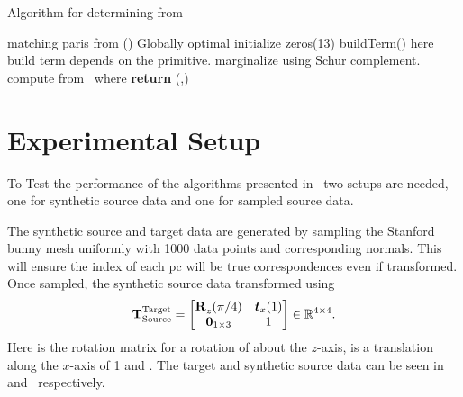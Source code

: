 \begin{algorithm}
	\algrenewcommand{}
	\algrenewcommand{}
	\caption{Algorithm for determining \tf[T]{\star}{} from }
	\label{alg:t-star}
	\begin{algorithmic}[1]
		\Require matching paris from ()
		\Ensure Globally optimal \tf[T]{\star}{}
		\State initialize  zeros(\num{13})
			\State {} buildTerm() here build term depends on the primitive.
			\State {}
		\EndFor
		\State marginalize  using Schur complement.
		\State compute \tf[R]{\star}{} from~
		\State {} where 
		\State \textbf{return} \tf[T]{\star}{}(\tf[R]{\star}{},)
	\end{algorithmic}
\end{algorithm}

\newpage

\section{Experimental Setup}\label{sec:2-pose-estimation-experimental-setup}

To Test the performance of the algorithms presented in~ two setups are needed, one for synthetic source data and one for sampled source data. \medskip

The synthetic source and target data are generated by sampling the Stanford bunny mesh uniformly with \num{1000} data points and corresponding normals. This will ensure the index  of each \gls{pc} will be true correspondences even if transformed. Once sampled, the synthetic source data transformed using
%
\begin{equation}
	\tf[T]{\text{Target}}{\text{Source}} = 
	\begin{bmatrix}
		\tf[R]{}{z}(\pi/4) & \vec{t}_x(1) \\
		\vec{0}_{1\times 3} & 1
	\end{bmatrix}\inR{4\times 4}.
\end{equation} 
Here  is the rotation matrix for a rotation of  about the $z$-axis,  is a translation along the $x$-axis of \num{1} and . The target and synthetic source data can be seen in  and~ respectively. \medskip

